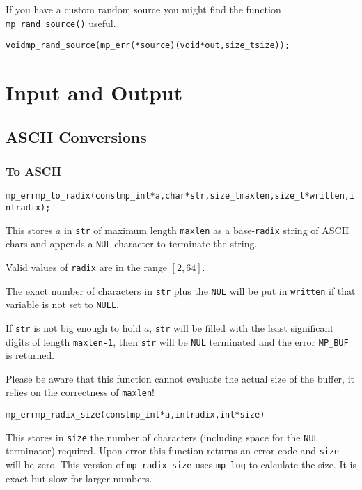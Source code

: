 \documentclass[synpaper]{book}
\begin{document}
If you have a custom random source you might find the function \texttt{mp\_rand\_source()} useful.

\begin{alltt}
void mp_rand_source(mp_err(*source)(void *out, size_t size));
\end{alltt}

\chapter{Input and Output}
\section{ASCII Conversions}
\subsection{To ASCII}
\begin{alltt}
mp_err mp_to_radix (const mp_int *a, char *str, size_t maxlen, size_t *written, int radix);
\end{alltt}
This stores $a$ in \texttt{str} of maximum length \texttt{maxlen} as a base-\texttt{radix} string
of ASCII chars and appends a \texttt{NUL} character to terminate the string.

Valid values of \texttt{radix} are in the range $[2, 64]$.

The exact number of characters in \texttt{str} plus the \texttt{NUL} will be put in
\texttt{written} if that variable is not set to \texttt{NULL}.

If \texttt{str} is not big enough to hold $a$, \texttt{str} will be filled with the least
significant digits of length \texttt{maxlen-1}, then \texttt{str} will be \texttt{NUL} terminated
and the error \texttt{MP\_BUF} is returned.

Please be aware that this function cannot evaluate the actual size of the buffer, it relies on the
correctness of \texttt{maxlen}!

\begin{alltt}
mp_err mp_radix_size (const mp_int *a, int radix, int *size)
\end{alltt}
This stores in \texttt{size} the number of characters (including space for the \texttt{NUL}
terminator) required. Upon error this function returns an error code and \texttt{size} will be
zero. This version of \texttt{mp\_radix\_size} uses \texttt{mp\_log} to calculate the size. It
is exact but slow for larger numbers.
\end{document}
